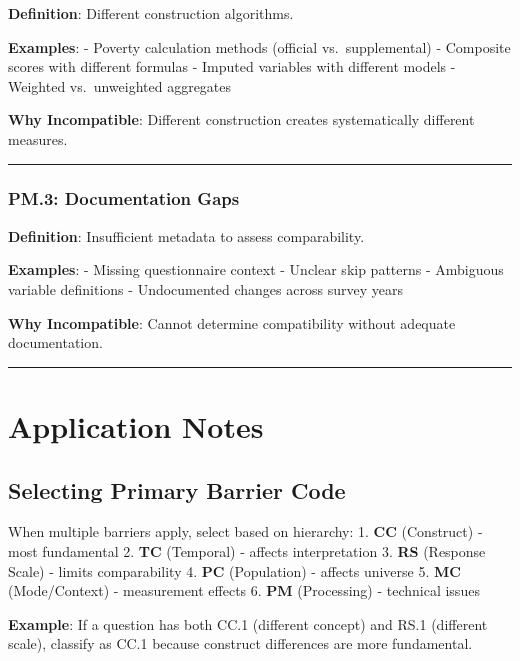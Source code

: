 \documentclass[
  letterpaper,
]{report}
\begin{document}
\textbf{Definition}: Different construction algorithms.

\textbf{Examples}: - Poverty calculation methods (official
vs.~supplemental) - Composite scores with different formulas - Imputed
variables with different models - Weighted vs.~unweighted aggregates

\textbf{Why Incompatible}: Different construction creates systematically
different measures.

\begin{center}\rule{0.5\linewidth}{0.5pt}\end{center}

\subsubsection{PM.3: Documentation Gaps}\label{pm.3-documentation-gaps}

\textbf{Definition}: Insufficient metadata to assess comparability.

\textbf{Examples}: - Missing questionnaire context - Unclear skip
patterns - Ambiguous variable definitions - Undocumented changes across
survey years

\textbf{Why Incompatible}: Cannot determine compatibility without
adequate documentation.

\begin{center}\rule{0.5\linewidth}{0.5pt}\end{center}

\section{Application Notes}\label{application-notes}

\subsection{Selecting Primary Barrier
Code}\label{selecting-primary-barrier-code}

When multiple barriers apply, select based on hierarchy: 1. \textbf{CC}
(Construct) - most fundamental 2. \textbf{TC} (Temporal) - affects
interpretation 3. \textbf{RS} (Response Scale) - limits comparability 4.
\textbf{PC} (Population) - affects universe 5. \textbf{MC}
(Mode/Context) - measurement effects 6. \textbf{PM} (Processing) -
technical issues

\textbf{Example}: If a question has both CC.1 (different concept) and
RS.1 (different scale), classify as CC.1 because construct differences
are more fundamental.
\end{document}
